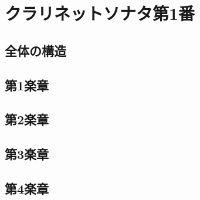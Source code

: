 
\chapter{クラリネットソナタ第1番}

\section{全体の構造}

\section{第1楽章}

\section{第2楽章}

\section{第3楽章}

\section{第4楽章}
